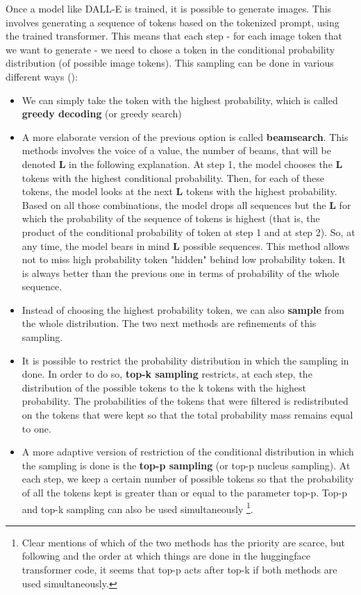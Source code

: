 \documentclass{article}
\begin{document}
Once a model like DALL-E is trained, it is possible to generate images. This involves generating a sequence of tokens based on the tokenized prompt, using the trained transformer. This means that each step - for each image token that we want to generate - we need to chose a token in the conditional probability distribution (of possible image tokens). \hypertarget{options-generation}{This sampling can be done in various different ways }(\cite{howtogen}):
\begin{itemize}
    \item We can simply take the token with the highest probability, which is called \textbf{greedy decoding} (or greedy search)
    \item A more elaborate version of the previous option is called \textbf{beamsearch}. This methods involves the voice of a value, the number of beams, that will be denoted \textbf{L} in the following explanation. At step 1, the model chooses the \textbf{L} tokens with the highest conditional probability. Then, for each of these tokens, the model looks at the next \textbf{L} tokens with the highest probability. Based on all those combinations, the model drops all sequences but the \textbf{L} for which the probability of the sequence of tokens is highest (that is, the product of the conditional probability of token at step 1 and at step 2). So, at any time, the model bears in mind \textbf{L} possible sequences. This method allows not to miss high probability token "hidden" behind low probability token. It is always better than the previous one in terms of probability of the whole sequence. 
    \item Instead of choosing the highest probability token, we can also \textbf{sample} from the whole distribution. The two next methods are refinements of this sampling. 
    \item It is possible to restrict the probability distribution in which the sampling in done. In order to do so, \textbf{top-k sampling} restricts, at each step, the distribution of the possible tokens to the k tokens with the highest probability. The probabilities of the tokens that were filtered is redistributed on the tokens that were kept so that the total probability mass remains equal to one. 
    \item A more adaptive version of restriction of the conditional distribution in which the sampling is done is the \textbf{top-p sampling} (or top-p nucleus sampling). At each step, we keep a certain number of possible tokens so that the probability of all the tokens kept is greater than or equal to the parameter top-p. Top-p and top-k sampling can also be used simultaneously \footnote{Clear mentions of which of the two methods has the priority are scarce, but following \cite{congen} and the order at which things are done in the huggingface transformer code, it seems that top-p acts after top-k if both methods are used simultaneously.}.
\end{itemize}
\end{document}
